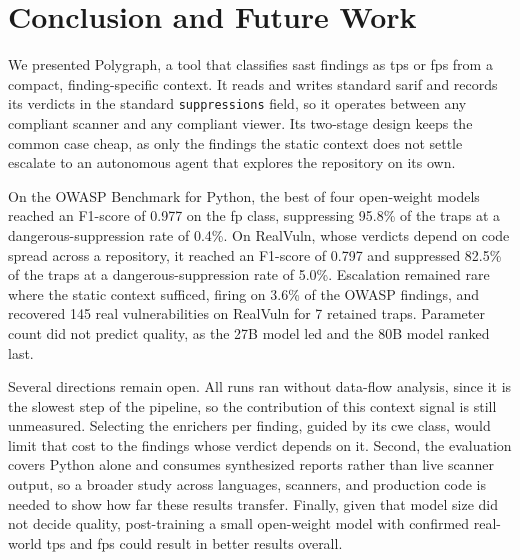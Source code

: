\section{Conclusion and Future Work}

We presented Polygraph, a tool that classifies \ac{sast} findings as \acp{tp}
or \acp{fp} from a compact, finding-specific context. It reads and writes
standard \ac{sarif} and records its verdicts in the standard
\texttt{suppressions} field, so it operates between any compliant scanner and any
compliant viewer. Its two-stage design keeps the common case cheap, as only the
findings the static context does not settle escalate to an autonomous agent that
explores the repository on its own.

On the OWASP Benchmark for Python, the best of four open-weight models reached an
F1-score of 0.977 on the \ac{fp} class, suppressing 95.8\% of the traps at
a dangerous-suppression rate of 0.4\%. On RealVuln, whose verdicts depend on code
spread across a repository, it reached an F1-score of 0.797 and suppressed 82.5\%
of the traps at a dangerous-suppression rate of 5.0\%. Escalation remained rare
where the static context sufficed, firing on 3.6\% of the OWASP findings, and
recovered 145 real vulnerabilities on RealVuln for 7 retained traps. Parameter
count did not predict quality, as the 27B model led and the 80B model ranked
last.

Several directions remain open. All runs ran without data-flow analysis, since it
is the slowest step of the pipeline, so the contribution of this context signal
is still unmeasured. Selecting the enrichers per finding,
guided by its \ac{cwe} class, would limit that cost to the findings whose
verdict depends on it. Second,
the evaluation covers Python alone and consumes synthesized reports rather than
live scanner output, so a broader study across languages, scanners, and
production code is needed to show how far these results transfer. Finally, given that
model size did not decide quality, post-training a small open-weight model
with confirmed real-world \acp{tp} and \acp{fp} could result in better results overall.
